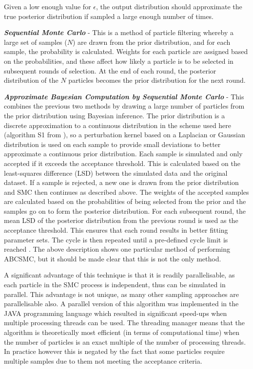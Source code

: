 Given a low enough value for $\epsilon$, the output distribution should approximate the true posterior distribution if sampled a large enough number of times.

\textbf{\textit{Sequential Monte Carlo}} - This is a method of particle filtering whereby a large set of samples ($N$) are drawn from the prior distribution, and for each sample, the probability is calculated. Weights for each particle are assigned based on the probabilities, and these affect how likely a particle is to be selected in subsequent rounds of selection. At the end of each round, the posterior distribution of the $N$ particles becomes the prior distribution for the next round.

\textbf{\textit{Approximate Bayesian Computation by Sequential Monte Carlo}} - This combines the previous two methods by drawing a large number of particles from the prior distribution using Bayesian inference. The prior distribution is a discrete approximation to a continuous distribution in the scheme used here (algorithm S1 from \citet{Toni2009}), so a perturbation kernel based on a Laplacian or Gaussian distribution is used on each sample to provide small deviations to better approximate a continuous prior distribution. Each sample is simulated and only accepted if it exceeds the acceptance threshold. This is calculated based on the least-squares difference (LSD) between the simulated data and the original dataset. If a sample is rejected, a new one is drawn from the prior distribution and SMC then continues as described above. The weights of the accepted samples are calculated based on the probabilities of being selected from the prior and the samples go on to 
form the posterior distribution. For 
each subsequent round, the mean LSD of the
posterior distribution from the previous round is used as the acceptance threshold. This ensures that each round results in better fitting parameter sets. The cycle is then repeated until a pre-defined cycle limit is reached \cite{Toni2009}. The above description shows one particular method of performing ABCSMC, but it should be made clear that this is not the only method.

A significant advantage of this technique is that it is readily parallelisable, as each particle in the SMC process is independent, thus can be simulated in parallel. This advantage is not unique, as many other sampling approaches are parallelisable also. A parallel version of this algorithm was implemented in the JAVA programming language which resulted in significant speed-ups when multiple processing threads can be used. The threading manager means that the algorithm is theoretically most efficient (in terms of computational time) when the number of particles is an exact multiple of the number of processing threads. In practice however this is negated by the fact that some particles require multiple samples due to them not meeting the acceptance criteria.

